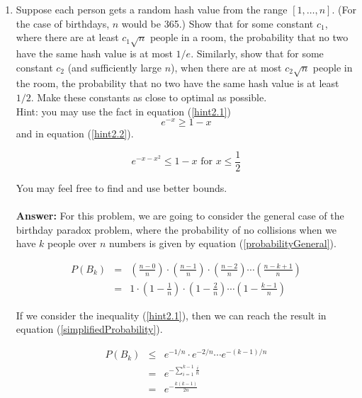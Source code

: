 \documentclass[tikz, 12pt]{scrartcl}
\begin{document}
\begin{enumerate}
	\item Suppose each person gets a random hash value from the range $[1, \ldots, n]$. (For the case of birthdays, $n$ would be 365.) Show that for some constant $c_1$, where there are at least $c_1 \sqrt{n}$ people in a room, the probability that no two have the same hash value is at most $1/e$. Similarly, show that for some constant $c_2$ (and sufficiently large $n$), when there are at most $c_2 \sqrt{n}$ people in the room, the probability that no two have the same hash value is at least $1/2$. Make these constants as close to optimal as possible.\\
	Hint: you may use the fact in equation (\ref{hint2.1})
	\begin{equation}\label{hint2.1}
		e^{-x} \geq 1 - x
	\end{equation}
	and in equation (\ref{hint2.2}).
	
	\begin{equation}\label{hint2.2}
	e^{-x - x^2} \leq 1 - x \mbox{ for } x \leq \frac{1}{2}
	\end{equation}
	
	You may feel free to find and use better bounds.\\
	\\
	\textbf{Answer: } For this problem, we are going to consider the general case of the birthday paradox problem, where the probability of no collisions when we have $k$ people over $n$ numbers is given by equation (\ref{probabilityGeneral}).
	
	\begin{eqnarray}
	P(B_k) 	&	=	&	\left( \frac{n - 0}{n} \right) \cdot  \left( \frac{n - 1}{n} \right) \cdot \left( \frac{n - 2}{n} \right)\cdots\left( \frac{n - k + 1}{n} \right) \nonumber \\
			&	=	&	1 \cdot \left(1 -  \frac{1}{n} \right)\cdot \left(1 -  \frac{2}{n} \right) \cdots \left(1 -  \frac{k-1}{n} \right)\label{probabilityGeneral}
	\end{eqnarray}
	
	If we consider the inequality (\ref{hint2.1}), then we can reach the result in equation (\ref{simplifiedProbability}).
	
	\begin{eqnarray}
	P(B_k)	&	\leq	&	e^{-1/n} \cdot e^{-2/n} \cdots e^{-(k - 1)/n} \nonumber \\
			&	=	&	e^{-\sum_{i = 1}^{k -1} \frac{i}{n}} \nonumber \\
			&	=	&	e^{-\frac{k(k-1)}{2n}} \label{simplifiedProbability}
	\end{eqnarray}
	

\end{enumerate}
\end{document}

